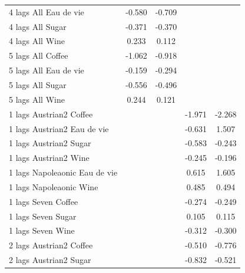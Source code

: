 \documentclass[12pt,a4paper,titlepage]{article}
\begin{document}
{\begin{longtable}{l*{4}{c}}
4 lags All Eau de vie&      -0.580         &      -0.709         &                     &                     \\
4 lags All Sugar    &      -0.371\sym{*}  &      -0.370\sym{**} &                     &                     \\
4 lags All Wine     &       0.233         &       0.112         &                     &                     \\
5 lags All Coffee   &      -1.062\sym{***}&      -0.918\sym{***}&                     &                     \\
5 lags All Eau de vie&      -0.159         &      -0.294         &                     &                     \\
5 lags All Sugar    &      -0.556\sym{**} &      -0.496\sym{***}&                     &                     \\
5 lags All Wine     &       0.244         &       0.121         &                     &                     \\
1 lags Austrian2 Coffee&                     &                     &      -1.971\sym{***}&      -2.268\sym{***}\\
1 lags Austrian2 Eau de vie&                     &                     &      -0.631         &       1.507         \\
1 lags Austrian2 Sugar&                     &                     &      -0.583\sym{***}&      -0.243         \\
1 lags Austrian2 Wine&                     &                     &      -0.245         &      -0.196         \\
1 lags Napoleaonic Eau de vie&                     &                     &       0.615         &       1.605         \\
1 lags Napoleaonic Wine&                     &                     &       0.485         &       0.494         \\
1 lags Seven Coffee &                     &                     &      -0.274\sym{*}  &      -0.249\sym{*}  \\
1 lags Seven Sugar  &                     &                     &       0.105         &       0.115         \\
1 lags Seven Wine   &                     &                     &      -0.312\sym{*}  &      -0.300\sym{**} \\
2 lags Austrian2 Coffee&                     &                     &      -0.510\sym{**} &      -0.776\sym{***}\\
2 lags Austrian2 Sugar&                     &                     &      -0.832\sym{***}&      -0.521         \\

\end{longtable}}
\end{document}
